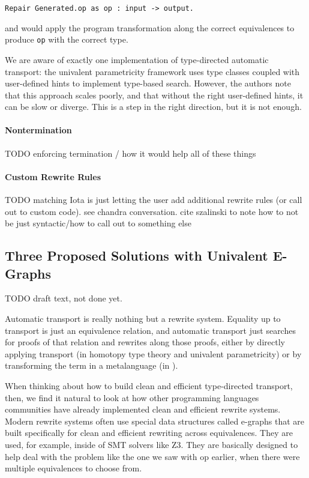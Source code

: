 \begin{lstlisting}
Repair Generated.op as op : input -> output.
\end{lstlisting}
and \toolname would apply the program transformation along the correct equivalences
to produce \lstinline{op} with the correct type.

We are aware of exactly one implementation of type-directed automatic transport:
the univalent parametricity framework uses type classes coupled with user-defined hints to implement type-based search.
However, the authors note that this approach scales poorly, and that without the right user-defined
hints, it can be slow or diverge.
This is a step in the right direction, but it is not enough.

\paragraph{Nontermination}

TODO enforcing termination / how it would help all of these things

\paragraph{Custom Rewrite Rules}

TODO matching Iota is just letting the user add additional rewrite rules (or call out to custom code).
see chandra conversation.
cite szalinski to note how to not be just syntactic/how to call out to something else

\subsection{Three Proposed Solutions with Univalent E-Graphs}
\label{sec:egraph}

TODO draft text, not done yet.

Automatic transport is really nothing but a rewrite system.
Equality up to transport is just an equivalence relation, and automatic transport just searches for proofs of that relation and rewrites along those proofs, either by directly applying transport (in homotopy type theory and univalent parametricity) or by transforming the term in a metalanguage (in \toolname).

When thinking about how to build clean and efficient type-directed transport, then, we find it natural to look
at how other programming languages communities have already implemented clean and efficient rewrite systems.
Modern rewrite systems often use special data structures called e-graphs that are built specifically
for clean and efficient rewriting across equivalences.
They are used, for example, inside of SMT solvers like Z3.
They are basically designed to help deal with the problem like the one we saw with op earlier, when there were multiple equivalences to 
choose from.

